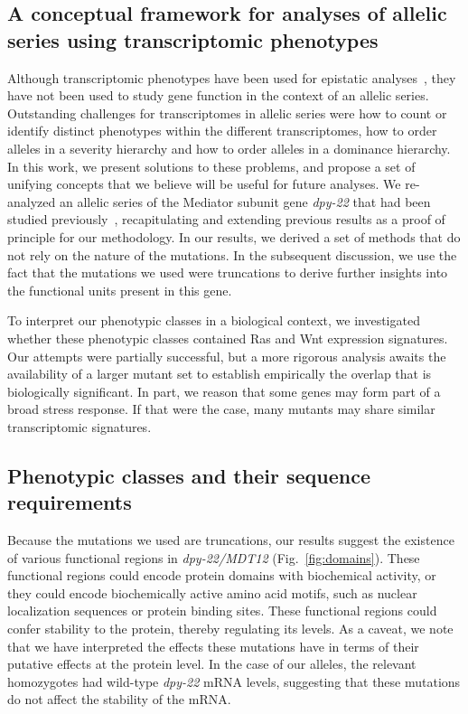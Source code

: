 \documentclass[9pt,twocolumn,twoside]{gsajnl}
\newcommand{\gene}[1]{\mbox{\emph{#1}}}
\newcommand{\dpy}[1]{\gene{dpy-22#1}}
\begin{document}
\subsection{A conceptual framework for analyses of allelic series using
transcriptomic phenotypes}
Although transcriptomic phenotypes have been used for epistatic
analyses~\citep{Dixit2016,AngelesAlboresHIF,Angeles-Albores2017}, they have not
been used to study gene function in the context of an allelic series.
Outstanding challenges for transcriptomes in allelic series were how to count or
identify distinct phenotypes within the different transcriptomes, how to order
alleles in a severity hierarchy and how to order alleles in a dominance
hierarchy. In this work, we present solutions to these problems, and propose a
set of unifying concepts that we believe will be useful for future analyses. We
re-analyzed an allelic series of the Mediator subunit gene \dpy{} that had been
studied previously~\citep{Moghal2003}, recapitulating and extending previous
results as a proof of principle for our methodology. In our results, we derived
a set of methods that do not rely on the nature of the mutations. In the
subsequent discussion, we use the fact that the mutations we used were
truncations to derive further insights into the functional units present in this
gene.

To interpret our phenotypic classes in a biological context, we investigated
whether these phenotypic classes contained Ras and Wnt expression signatures.
Our attempts were partially successful, but a more rigorous analysis awaits the
availability of a larger mutant set to establish empirically the overlap that is
biologically significant. In part, we reason that some genes may form part of a
broad stress response. If that were the case, many mutants may share similar
transcriptomic signatures.

\subsection*{Phenotypic classes and their sequence requirements}
Because the mutations we used are truncations, our results suggest the existence
of various functional regions in \dpy{/MDT12} (Fig.~\ref{fig:domains}). These
functional regions could encode protein domains with biochemical activity, or
they could encode biochemically active amino acid motifs, such as nuclear
localization sequences or protein binding sites. These functional regions could
confer stability to the protein, thereby regulating its levels. As a caveat, we
note that we have interpreted the effects these mutations have in terms of their
putative effects at the protein level. In the case of our alleles, the relevant
homozygotes had wild-type \dpy{} mRNA levels, suggesting that these mutations
do not affect the stability of the mRNA.
\end{document}
